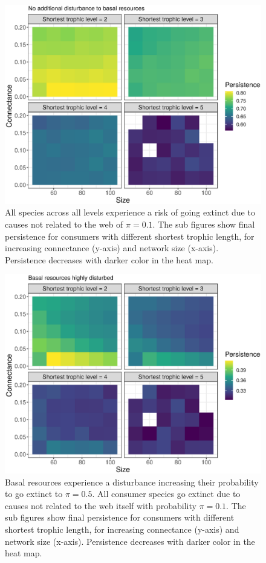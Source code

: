 \documentclass[12pt]{article}
\begin{document}
\begin{spacing}{2.0}
    \begin{figure}[hb!]
     \centering
     \includegraphics[width=.9\textwidth]{figures/heatmap_STL_allCS_BP0.eps}
     \caption{All species across all levels experience a risk of going extinct due to causes not related to the web of $\pi = 0.1$. The sub figures show final persistence for consumers with different shortest trophic length, for increasing connectance (y-axis) and network size (x-axis). Persistence decreases with darker color in the heat map.}
     \label{fig:heatmap_stl_BP0}
    \end{figure}


    \begin{figure}[hb!]
     \centering
     \includegraphics[width=.9\textwidth]{figures/heatmap_STL_allCS_BP1.eps}
     \caption{Basal resources experience a disturbance increasing their probability to go extinct to $\pi = 0.5$. All consumer species go extinct due to causes not related to the web itself with probability $\pi = 0.1$. The sub figures show final persistence for consumers with different shortest trophic length, for increasing connectance (y-axis) and network size (x-axis). Persistence decreases with darker color in the heat map.}
     \label{fig:heatmap_stl_BP1}
    \end{figure}


\end{spacing}
\end{document}
